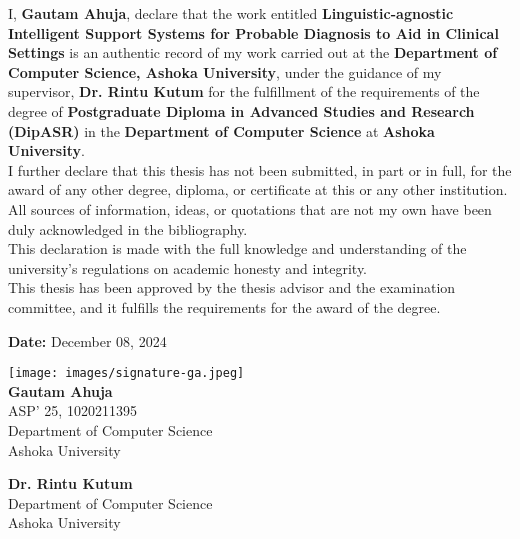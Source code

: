 I, \textbf{Gautam Ahuja}, declare that the work entitled \textbf{Linguistic-agnostic Intelligent Support Systems for Probable Diagnosis to Aid in Clinical Settings} is an authentic record of my work carried out at the \textbf{Department of Computer Science, Ashoka University}, under the guidance of my supervisor, \textbf{Dr. Rintu Kutum} for the fulfillment of the requirements of the degree of \textbf{Postgraduate Diploma in Advanced Studies and Research (DipASR)} in the \textbf{Department of Computer Science} at \textbf{Ashoka University}. \\%

\noindent I further declare that this thesis has not been submitted, in part or in full, for the award of any other degree, diploma, or certificate at this or any other institution. All sources of information, ideas, or quotations that are not my own have been duly acknowledged in the bibliography. \\ %


\noindent This declaration is made with the full knowledge and understanding of the university's regulations on academic honesty and integrity. \\%


\noindent This thesis has been approved by the thesis advisor and the examination committee, and it fulfills the requirements for the award of the degree.\\%

\begin{flushleft}
\textbf{Date:} December 08, 2024
\end{flushleft}

\begin{flushright}
\texttt{[image: images/signature-ga.jpeg]}\\
\textbf{Gautam Ahuja}\\
ASP' 25, 1020211395\\
Department of Computer Science\\
Ashoka University\\
\end{flushright}

\vspace{1.25cm}
\begin{flushright}
\textbf{Dr. Rintu Kutum}\\
Department of Computer Science\\
Ashoka University\\
\end{flushright}
